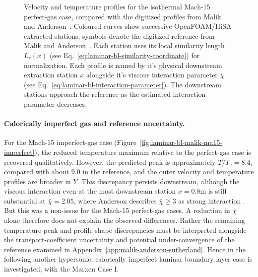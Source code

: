 \begin{figure}[H]
{        Velocity and temperature profiles for the isothermal Mach-15
        perfect-gas case, compared with the digitized profiles from
        Malik and Anderson~\citep[Fig.~3]{MalikAnderson1991RealGas}. Coloured curves show successive OpenFOAM/HiSA extracted
        stations; symbols denote the digitized reference from
        Malik and Anderson~\citep[Fig.~1]{MalikAnderson1991RealGas}.
        Each station uses its local similarity length \(L_r(x)\) (see Eq.~\eqref{eq:laminar-bl-similarity-coordinate}) for normalization. Each profile is named by it's physical downstream extraction station \(x\) alongside it's viscous interaction parameter \(\bar{\chi}\) (see Eq.~\eqref{eq:laminar-bl-interaction-parameter}).
        The downstream stations approach the reference as the estimated interaction parameter decreases.}
    \label{fig:laminar-bl-malik-ma15-perfect}
\end{figure}

\clearpage
\paragraph{Calorically imperfect gas and reference uncertainty.}
For the Mach-15 imperfect-gas case
(Figure~\ref{fig:laminar-bl-malik-ma15-imperfect}), the reduced temperature
maximum relative to the perfect-gas case is recovered qualitatively.
However, the predicted peak is approximately \(T/T_e=8.4\), compared with
about \(9.0\) in the reference, and the outer velocity and temperature
profiles are broader in \(Y\). This discrepancy persists downstream, although the viscous interaction even at the most downstream station \(x=0.8\mathrm{m}\) is still substantial at \(\bar{\chi}=2.05\), where Anderson describes \(\bar{\chi}\ge3\) as strong interaction \cite[p. 388]{anderson1989hypersonic}. But this was a non-issue for the Mach-15 perfect-gas cases. A reduction in
\(\bar{\chi}\) alone therefore does not explain the observed differences. Rather the remaining temperature-peak and profile-shape discrepancies must be interpreted alongside the transport-coefficient uncertainty and potential under-convergence of the reference examined in Appendix~\ref{app:malik-anderson-sutherland}. Hence in the following another hypersonic, calorically imperfect laminar boundary layer case is investigated, with the Marxen Case I.

